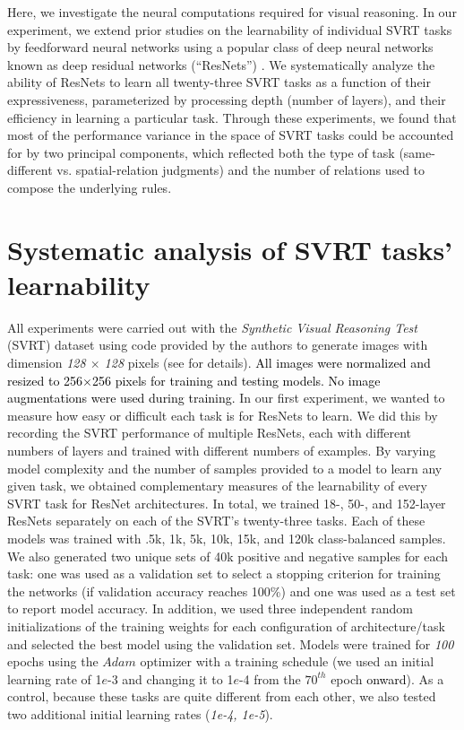 Here, we investigate the neural computations required for visual reasoning. In our experiment, we extend prior studies on the learnability of individual SVRT tasks by feedforward neural networks using a popular class of deep neural networks known as deep residual networks (``ResNets'') \citep{he2016deep}. We systematically analyze the ability of ResNets to learn all twenty-three SVRT tasks as a function of their expressiveness, parameterized by processing depth (number of layers), and their efficiency in learning a particular task. Through these experiments, we found that most of the performance variance in the space of SVRT tasks could be accounted for by two principal components, which reflected both the type of task (same-different vs. spatial-relation judgments) and the number of relations used to compose the underlying rules. 

\section{Systematic analysis of SVRT tasks' learnability}


All experiments were carried out with the \textit{Synthetic Visual Reasoning Test} (SVRT) dataset using code provided by the authors to generate images with dimension \textit{128 $\times$ 128} pixels (see \citet{fleuret2011comparing} for details). \textcolor{black}{ All images were normalized and resized to 256$\times$256 pixels for training and testing models. No image augmentations were used during training.}
In our first experiment, we wanted to measure how easy or difficult each task is for ResNets to learn. We did this by recording the SVRT performance of multiple ResNets, each with different numbers of layers and trained with different numbers of examples. By varying model complexity and the number of samples provided to a model to learn any given task, we obtained complementary measures of the learnability of every SVRT task for ResNet architectures. In total, we trained 18-, 50-, and 152-layer ResNets separately on each of the SVRT's twenty-three tasks. Each of these models was trained with .5k, 1k, 5k, 10k, 15k, and 120k class-balanced samples. We also generated two unique sets of 40k positive and negative samples for each task: one was used as a validation set to select a stopping criterion for training the networks (if validation accuracy reaches 100\%) and one was used as a test set to report model accuracy. In addition, we used three independent random initializations of the training weights for each configuration of architecture/task and selected the best model using the validation set. Models were trained for \textit{100} epochs using the $Adam$ optimizer \citep{kingma2014adam}  with a training schedule (we used an initial learning rate of 1$e$-3 and changing it to 1$e$-4  from the $70^{th}$ epoch \textcolor{black}{onward}). As a control, because these tasks are quite different from each other, we also tested two additional initial learning rates (\textit{1e-4, 1e-5}). 


